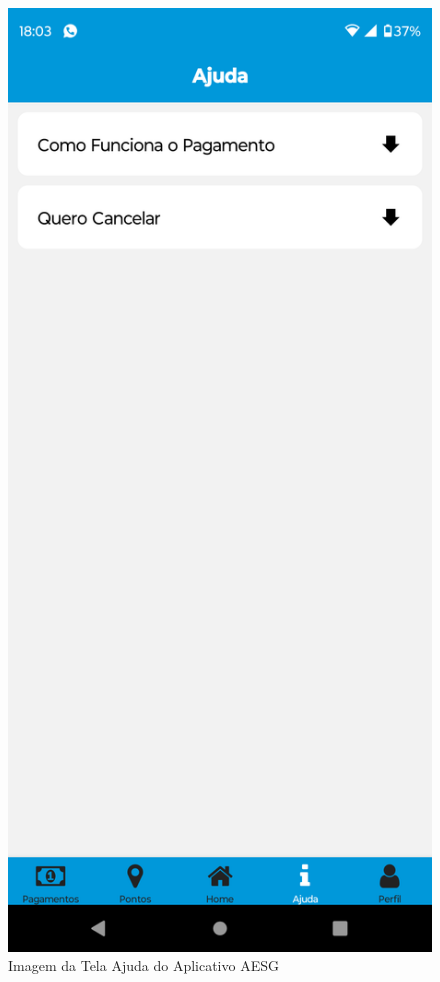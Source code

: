 \documentclass[
    12pt,                   %
    openright,              %
    oneside,                %
    a4paper,                %
    sumario=tradicional,    %
    english,                %
    brazil,                 %
    ]{abntex2}
\begin{document}
            \begin{figure}[!h]          
                \begin{minipage}{0.5\textwidth}
                    \centering
                    \includegraphics[width=0.8\linewidth]{Imagens/App Images User/AUAjuda1.png}
                    \caption[Imagem da Tela Ajuda do Aplicativo AESG]{ 
                    Imagem da Tela Ajuda do Aplicativo AESG}
                    \label{fig:AppTelaAjuda}

\end{minipage}
\end{figure}
\end{document}
